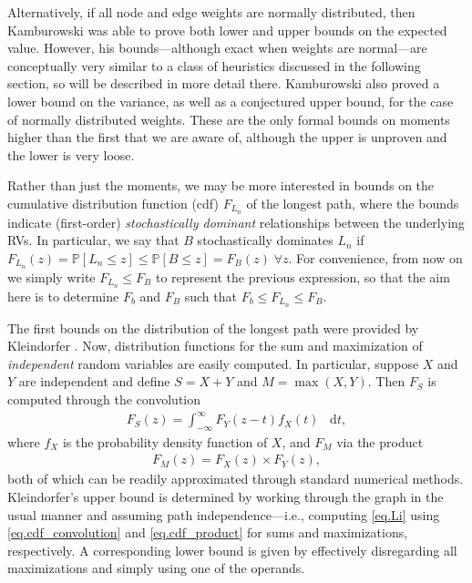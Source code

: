 \documentclass[12pt]{article}
\def\P{\mathbb{P}}
\def\diff{\mathop{}\!\mathrm{d}}
\begin{document}
Alternatively, if all node and edge weights are normally distributed, then Kamburowski \cite{kam85} was able to prove both lower and upper bounds on the expected value. However, his bounds---although exact when weights are normal---are conceptually very similar to a class of heuristics discussed in the following section, so will be described in more detail there. Kamburowski also proved a lower bound on the variance, as well as a conjectured upper bound, for the case of normally distributed weights. These are the only formal bounds on moments higher than the first that we are aware of, although the upper is unproven and the lower is very loose.

Rather than just the moments, we may be more interested in bounds on the cumulative distribution function (cdf) $F_{L_n}$ of the longest path, where the bounds indicate (first-order) {\em stochastically dominant} relationships between the underlying RVs. In particular, we say that $B$ stochastically dominates $L_n$ if $F_{L_n}(z) = \P[L_n \leq z] \leq \P[B \leq z] = F_B(z) \; \forall z$. For convenience, from now on we simply write $F_{L_n} \leq F_B$ to represent the previous expression, so that the aim here is to determine $F_b$ and $F_B$ such that $F_b \leq F_{L_n} \leq F_B$.

The first bounds on the distribution of the longest path were provided by Kleindorfer \cite{kle71}. Now, distribution functions for the sum and maximization of {\em independent} random variables are easily computed. In particular, suppose $X$ and $Y$ are independent and define $S = X + Y$ and $M = \max(X, Y)$. Then $F_S$ is computed through the convolution
\begin{align}
  \label{eq.cdf_convolution}
  F_S(z) = \int_{-\infty}^{\infty} F_Y(z - t) f_X(t) \; \diff t,
\end{align}
where $f_X$ is the probability density function of $X$, and $F_M$ via the product
\begin{align}
  \label{eq.cdf_product}
  F_M(z) = F_X(z) \times F_Y(z),
\end{align}
both of which can be readily approximated through standard numerical methods. Kleindorfer's upper bound is determined by working through the graph in the usual manner and assuming path independence---i.e., computing \eqref{eq.Li} using \eqref{eq.cdf_convolution} and \eqref{eq.cdf_product} for sums and maximizations, respectively. A corresponding lower bound is given by effectively disregarding all maximizations and simply using one of the operands.
\end{document}
